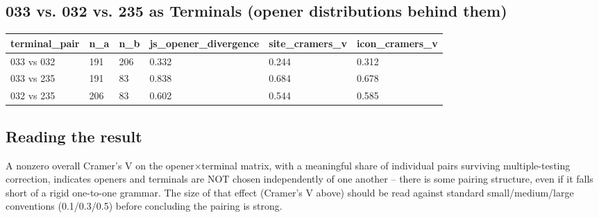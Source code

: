 \subsection{033 vs. 032 vs. 235 as Terminals (opener distributions behind them)}
\begin{tabular}{llllll}
\toprule
\textbf{terminal\_pair} & \textbf{n\_a} & \textbf{n\_b} & \textbf{js\_opener\_divergence} & \textbf{site\_cramers\_v} & \textbf{icon\_cramers\_v} \\
\midrule
033 vs 032 & 191 & 206 & 0.332 & 0.244 & 0.312 \\
033 vs 235 & 191 & 83 & 0.838 & 0.684 & 0.678 \\
032 vs 235 & 206 & 83 & 0.602 & 0.544 & 0.585 \\
\bottomrule
\end{tabular}

\subsection*{Reading the result}
A nonzero overall Cramer's V on the opener$\times$terminal matrix, with a
meaningful share of individual pairs surviving multiple-testing correction,
indicates openers and terminals are NOT chosen independently of one another
-- there is some pairing structure, even if it falls short of a rigid
one-to-one grammar. The size of that effect (Cramer's V above) should be
read against standard small/medium/large conventions (0.1/0.3/0.5) before
concluding the pairing is strong.
